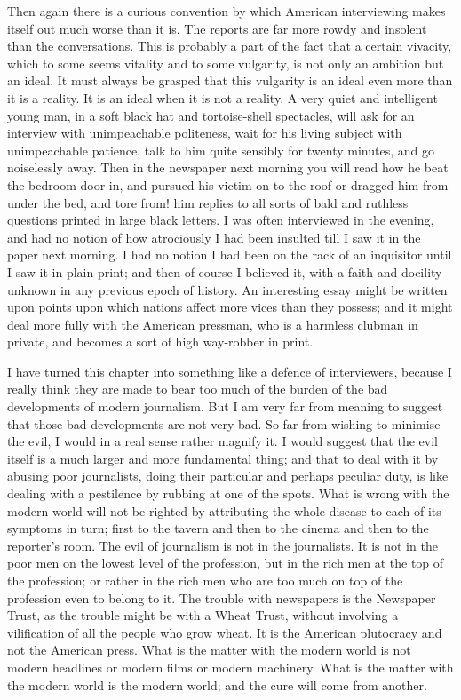\documentclass{book}
\begin{document}
Then again there is a curious convention by which American interviewing makes itself out much worse than it is. The reports are far more rowdy and insolent than the conversations. This is probably a part of the fact that a certain vivacity, which to some seems vitality and to some vulgarity, is not only an ambition but an ideal. It must always be grasped that this vulgarity is an ideal even more than it is a reality. It is an ideal when it is not a reality. A very quiet and intelligent young man, in a soft black hat and tortoise-shell spectacles, will ask for an interview with unimpeachable politeness, wait for his living subject with unimpeachable patience, talk to him quite sensibly for twenty minutes, and go noiselessly away. Then in the newspaper next morning you will read how he beat the bedroom door in, and pursued his victim on to the roof or dragged him from under the bed, and tore from! him replies to all sorts of bald and ruthless questions printed in large black letters. I was often interviewed in the evening, and had no notion of how atrociously I had been insulted till I saw it in the paper next morning. I had no notion I had been on the rack of an inquisitor until I saw it in plain print; and then of course I believed it, with a faith and docility unknown in any previous epoch of history. An interesting essay might be written upon points upon which nations affect more vices than they possess; and it might deal more fully with the American pressman, who is a harmless clubman in private, and becomes a sort of high way-robber in print.

I have turned this chapter into something like a defence of interviewers, because I really think they are made to bear too much of the burden of the bad developments of modern journalism. But I am very far from meaning to suggest that those bad developments are not very bad. So far from wishing to minimise the evil, I would in a real sense rather magnify it. I would suggest that the evil itself is a much larger and more fundamental thing; and that to deal with it by abusing poor journalists, doing their particular and perhaps peculiar duty, is like dealing with a pestilence by rubbing at one of the spots. What is wrong with the modern world will not be righted by attributing the whole disease to each of its symptoms in turn; first to the tavern and then to the cinema and then to the reporter’s room. The evil of journalism is not in the journalists. It is not in the poor men on the lowest level of the profession, but in the rich men at the top of the profession; or rather in the rich men who are too much on top of the profession even to belong to it. The trouble with newspapers is the Newspaper Trust, as the trouble might be with a Wheat Trust, without involving a vilification of all the people who grow wheat. It is the American plutocracy and not the American press. What is the matter with the modern world is not modern headlines or modern films or modern machinery. What is the matter with the modern world is the modern world; and the cure will come from another.
\end{document}
